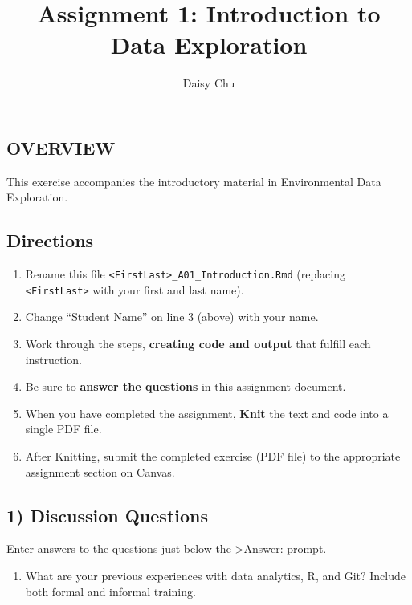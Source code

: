 \documentclass[
]{article}
\title{Assignment 1: Introduction to Data Exploration}
\author{Daisy Chu}
\date{}
\providecommand{\tightlist}{%
  \setlength{\itemsep}{0pt}\setlength{\parskip}{0pt}}
\begin{document}
\maketitle

\subsection{OVERVIEW}\label{overview}

This exercise accompanies the introductory material in Environmental
Data Exploration.

\subsection{Directions}\label{directions}

\begin{enumerate}
\def\labelenumi{\arabic{enumi}.}
\tightlist
\item
  Rename this file
  \texttt{\textless{}FirstLast\textgreater{}\_A01\_Introduction.Rmd}
  (replacing \texttt{\textless{}FirstLast\textgreater{}} with your first
  and last name).
\item
  Change ``Student Name'' on line 3 (above) with your name.
\item
  Work through the steps, \textbf{creating code and output} that fulfill
  each instruction.
\item
  Be sure to \textbf{answer the questions} in this assignment document.
\item
  When you have completed the assignment, \textbf{Knit} the text and
  code into a single PDF file.
\item
  After Knitting, submit the completed exercise (PDF file) to the
  appropriate assignment section on Canvas.
\end{enumerate}

\subsection{1) Discussion Questions}\label{discussion-questions}

Enter answers to the questions just below the \textgreater Answer:
prompt.

\begin{enumerate}
\def\labelenumi{\arabic{enumi}.}
\tightlist
\item
  What are your previous experiences with data analytics, R, and Git?
  Include both formal and informal training.
\end{enumerate}
\end{document}

